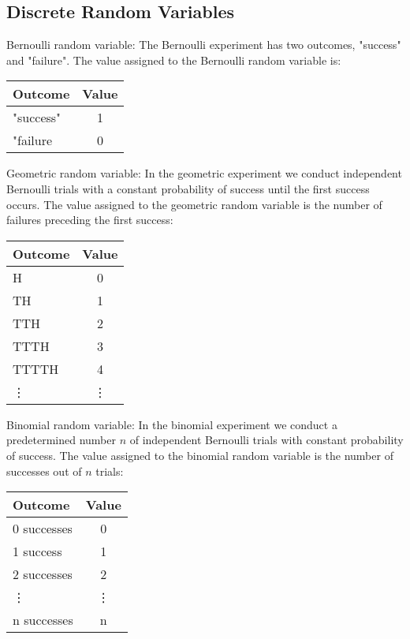 \subsection{Discrete Random Variables}
\par\vspace{0.5 cm}
\begin{example*}
Bernoulli random variable:  The Bernoulli experiment has two outcomes, "success" and "failure".  The value assigned to the Bernoulli random variable is:
\par\vspace{0.5 cm}
\begin{tabular}{lc}
Outcome & Value\\
\hline
"success" & 1\\
"failure & 0
\end{tabular}
\end{example*}
\par\vspace{0.5 cm}
\begin{example*}
Geometric random variable:  In the geometric experiment we conduct independent Bernoulli trials with a constant probability of success until the first success occurs.  The value assigned to the geometric random variable is the number of failures preceding the first success:
\par\vspace{0.5 cm}
\begin{tabular}{lc}
Outcome & Value\\
\hline
H & 0\\
TH & 1\\
TTH & 2\\
TTTH & 3 \\
TTTTH & 4\\
\vdots & \vdots
\end{tabular}
\end{example*}
\par\vspace{0.5 cm}
\begin{example*}
Binomial random variable:  In the binomial experiment we conduct a predetermined number $n$ of independent Bernoulli trials with constant probability of success.  The value assigned to the binomial random variable is the number of successes out of $n$ trials:
\par\vspace{0.5 cm}
\begin{tabular}{lc}
Outcome & Value\\
\hline
0 successes & 0\\
1 success & 1\\
2 successes & 2\\
\vdots & \vdots\\
n successes & n
\end{tabular}
\end{example*}
